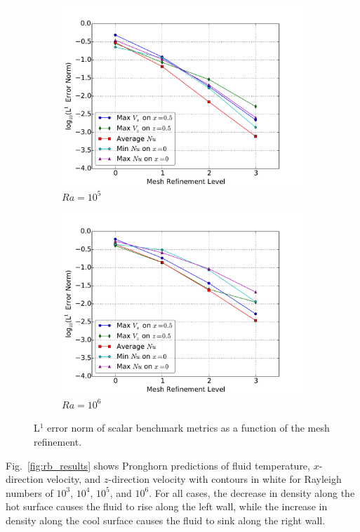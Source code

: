 \begin{figure}[!h]
\begin{subfigure}{0.48\textwidth}
  \includegraphics[width=\linewidth]{figs/Ra100000_mr.pdf}
  \caption{\(Ra=10^5\)}
  \label{fig:mr3}
\end{subfigure}
\begin{subfigure}{0.48\textwidth}
  \centering
  \includegraphics[width=\linewidth]{figs/Ra1000000_mr.pdf}
  \caption{\(Ra=10^6\)}
  \label{fig:mr4}
\end{subfigure}
\caption{L$^1$ error norm of scalar benchmark metrics as a function of the mesh refinement.}
\label{fig:mr}
\end{figure}

Fig.\ \ref{fig:rb_results} shows Pronghorn predictions of fluid temperature, \(x\)-direction velocity, and \(z\)-direction velocity with contours in white for Rayleigh numbers of \(10^3\), \(10^4\), \(10^5\), and \(10^6\). For all cases, the decrease in density along the hot surface causes the fluid to rise along the left wall, while the increase in density along the cool surface causes the fluid to sink along the right wall. 


